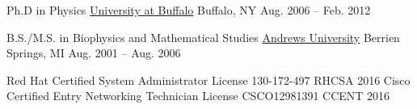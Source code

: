 

\begin{cventries}
  \cventry
    {Ph.D in Physics}                                  %
    {\href{www.buffalo.edu}{University at Buffalo}}    %
    {Buffalo, NY}                                      %
    {Aug. 2006 -- Feb. 2012}                           %
    { }%


  \cventry
    {B.S./M.S. in Biophysics and Mathematical Studies} %
    {\href{www.andrews.edu}{Andrews University}}       %
    {Berrien Springs, MI}                              %
    {Aug. 2001 -- Aug. 2006}                           %
    {}%

\end{cventries}

\begin{cvhonors}
    \cvhonor
    {Red Hat Certified System Administrator}
    {License 130-172-497}
    {RHCSA}
    {2016}
  \cvhonor
    {Cisco Certified Entry Networking Technician}
    {License CSCO12981391}
    {CCENT}
    {2016}
\end{cvhonors}



